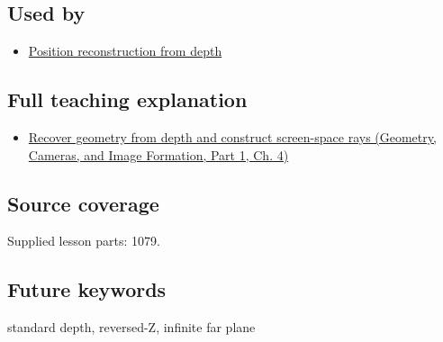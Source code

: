 \subsection{Used by}\label{appendix-1bc40b08db4a-used-by}

\hypertarget{appendix-1bc40b08db4a-used-by}{}

\begin{itemize}
\tightlist
\item
  \hyperref[appendix-2cbf2968e866]{Position reconstruction from depth}
\end{itemize}

\subsection{Full teaching explanation}\label{appendix-1bc40b08db4a-full-teaching-explanation}

\hypertarget{appendix-1bc40b08db4a-full-teaching-explanation}{}

\begin{itemize}
\tightlist
\item
  \href{../03-Geometry-Cameras-and-Image-Formation-P01/main.pdf\#nameddest=02-foundations-ii-ch035-recover-geometry-from-depth-and-construct-screen-space-rays}{Recover geometry from depth and construct screen-space rays (Geometry, Cameras, and Image Formation, Part 1, Ch. 4)}
\end{itemize}

\subsection{Source coverage}\label{appendix-1bc40b08db4a-source-coverage}

\hypertarget{appendix-1bc40b08db4a-source-coverage}{}

Supplied lesson parts: 1079.

\subsection{Future keywords}\label{appendix-1bc40b08db4a-future-keywords}

\hypertarget{appendix-1bc40b08db4a-future-keywords}{}

standard depth, reversed-Z, infinite far plane
